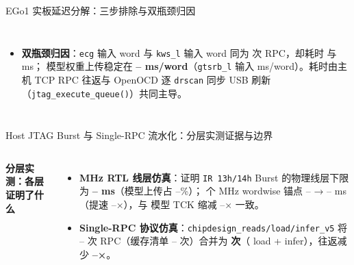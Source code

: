 \documentclass[10pt,aspectratio=169,hyperref={colorlinks,urlcolor=steel,linkcolor=}]{beamer}
\newcommand{\hl}[1]{\textcolor{peking}{\textbf{#1}}}
\begin{document}
\begin{frame}{EGo1 实板延迟分解：三步排除与双瓶颈归因}
\begin{columns}[T,onlytextwidth]
{\begin{itemize}
      \item \textbf{双瓶颈归因}：\texttt{ecg} 输入 \NFpgaEcgInWords{} word 与 \texttt{kws\_l} 输入 \NFpgaKwsLInWords{} word 同为 \NFpgaInSingleRpc{} 次 RPC，却耗时 \NFpgaEcgInRpcMs{} 与 \NFpgaKwsLInRpcMs{} ms；\NFpgaModels{} 模型权重上传稳定在 \hl{\NFpgaUpMpwMin–\NFpgaUpMpwMax{} ms/word}（\texttt{gtsrb\_l} 输入 \NFpgaGtsrbInMpw{} ms/word）。耗时由主机 TCP RPC 往返与 OpenOCD 逐 \texttt{drscan} 同步 USB 刷新（\texttt{jtag\_execute\_queue()}）共同主导。
    \end{itemize}}
  \end{columns}
\end{frame}

\begin{frame}{Host JTAG Burst 与 Single-RPC 流水化：分层实测证据与边界}
  \par\vspace{9pt}
  \begin{columns}[T,onlytextwidth]
    \textbf{分层实测：各层证明了什么}
    \begin{itemize}\setlength{\itemsep}{2pt}
      \item \textbf{\NRtlTckMhz{} MHz RTL 线层仿真}：证明 \texttt{IR 13h/14h} Burst 的物理线层下限为 \hl{\NRtlBurstMsMin–\NRtlBurstMsMax{} ms}（模型上传占 \NRtlUpPctMin–\NRtlUpPctMax\%）；\NRtlAnchorCount{} 个 \NRtlTckMhz{} MHz wordwise 锚点 \NRtlAnchorWordMin–\NRtlAnchorWordMax{} → \NRtlAnchorBurstMin–\NRtlAnchorBurstMax{} ms（提速 \NRtlAnchorSpMin–\NRtlAnchorSpMax×），与 \NRpcModels{} 模型 TCK 缩减 \NRtlTckCutMin–\NRtlTckCutMax× 一致。
      \item \textbf{Single-RPC 协议仿真}：\texttt{chipdesign\_reads/load/infer\_v5} 将 \NRpcBatchedMin–\NRpcBatchedMax{} 次 RPC（缓存清单 \NRpcCachedMin–\NRpcCachedMax{} 次）合并为 \hl{\NRpcPipe{} 次}（\NRpcPipeLoad{} load + \NRpcPipeInfer{} infer），往返减少 \hl{\NRpcSpMin–\NRpcSpMax×}。

\end{itemize}
\end{columns}
\end{frame}
\end{document}
